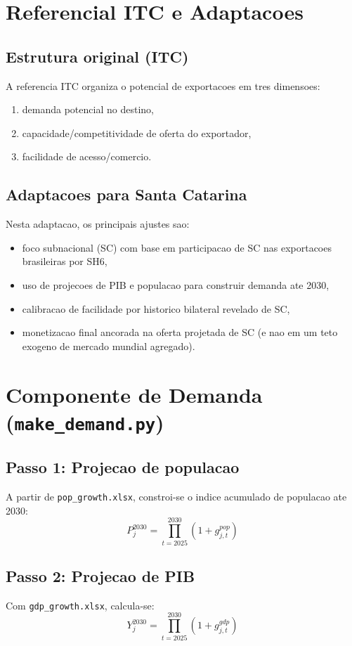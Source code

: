 \documentclass[12pt,a4paper]{article}
\begin{document}
\section{Referencial ITC e Adaptacoes}
\subsection{Estrutura original (ITC)}
A referencia ITC organiza o potencial de exportacoes em tres dimensoes:
\begin{enumerate}
    \item demanda potencial no destino,
    \item capacidade/competitividade de oferta do exportador,
    \item facilidade de acesso/comercio.
\end{enumerate}

\subsection{Adaptacoes para Santa Catarina}
Nesta adaptacao, os principais ajustes sao:
\begin{itemize}
    \item foco subnacional (SC) com base em participacao de SC nas exportacoes brasileiras por SH6,
    \item uso de projecoes de PIB e populacao para construir demanda ate 2030,
    \item calibracao de facilidade por historico bilateral revelado de SC,
    \item monetizacao final ancorada na oferta projetada de SC (e nao em um teto exogeno de mercado mundial agregado).
\end{itemize}

\section{Componente de Demanda (\texttt{make\_demand.py})}
\subsection{Passo 1: Projecao de populacao}
A partir de \texttt{pop\_growth.xlsx}, constroi-se o indice acumulado de populacao ate 2030:
\begin{equation}
P_j^{2030} = \prod_{t=2025}^{2030}(1+g_{j,t}^{pop})
\end{equation}

\subsection{Passo 2: Projecao de PIB}
Com \texttt{gdp\_growth.xlsx}, calcula-se:
\begin{equation}
Y_j^{2030} = \prod_{t=2025}^{2030}(1+g_{j,t}^{gdp})
\end{equation}
\end{document}
